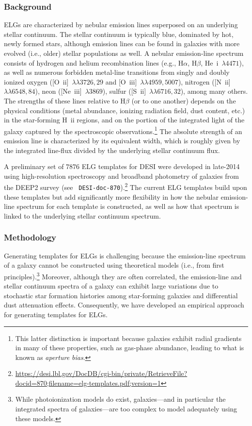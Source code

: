 \documentclass[12pt]{article}
\newcommand{\ha}{H\ensuremath{\alpha}}
\newcommand{\hb}{H\ensuremath{\beta}}
\newcommand{\heli}{He~{\sc i}~\ensuremath{\lambda4471}}
\newcommand{\hii}{H~{\sc ii}}
\newcommand{\niilam}{[N~{\sc ii}]~\ensuremath{\lambda\lambda6548,84}}
\newcommand{\siilam}{[S~{\sc ii}]~\ensuremath{\lambda\lambda6716,32}}
\newcommand{\oiilam}{[O~{\sc ii}]~\ensuremath{\lambda\lambda3726,29}}
\newcommand{\oiiilam}{[O~{\sc iii}]~\ensuremath{\lambda\lambda4959,5007}}
\newcommand{\neonlam}{[Ne~{\sc iii}]~\ensuremath{\lambda3869}}
\begin{document}
\subsubsection{Background}

ELGs are characterized by nebular emission lines superposed on an underlying
stellar continuum.  The stellar continuum is typically blue, dominated by hot,
newly formed stars, although emission lines can be found in galaxies with more
evolved (i.e., older) stellar populations as well.  A nebular emission-line
spectrum consists of hydrogen and helium recombination lines (e.g., \ha, \hb,
\heli), as well as numerous forbidden metal-line transitions from singly and
doubly ionized oxygen (\oiilam{} and \oiiilam), nitrogen (\niilam), neon
(\neonlam), sulfur (\siilam), among many others.  The strengths of these lines
relative to \hb{} (or to one another) depends on the physical conditions (metal
abundance, ionizing radiation field, dust content, etc.) in the star-forming
\hii{} regions, and on the portion of the integrated light of the galaxy
captured by the spectroscopic observations.\footnote{This latter distinction is
  important because galaxies exhibit radial gradients in many of these
  properties, such as gas-phase abundance, leading to what is known as {\em
    aperture bias}.}  The absolute strength of an emission line is characterized
by its equivalent width, which is roughly given by the integrated line-flux
divided by the underlying stellar continuum flux.

A preliminary set of $7876$ ELG templates for DESI were developed in late-2014
using high-resolution spectroscopy and broadband photometry of galaxies from the
DEEP2 survey (see {\tt
  DESI-doc-870}).\footnote{\url{https://desi.lbl.gov/DocDB/cgi-bin/private/RetrieveFile?docid=870;filename=elg-templates.pdf;version=1}}
The current ELG templates build upon these templates but add significantly more
flexibility in how the nebular emission-line spectrum for each template is
constructed, as well as how that spectrum is linked to the underlying stellar
continuum spectrum.

\subsubsection{Methodology}

Generating templates for ELGs is challenging because the emission-line spectrum
of a galaxy cannot be constructed using theoretical models (i.e., from first
principles).\footnote{While photoionization models do exist, galaxies---and in
  particular the integrated spectra of galaxies---are too complex to model
  adequately using these models.}  Moreover, although they are often correlated,
the emission-line and stellar continuum spectra of a galaxy can exhibit large
variations due to stochastic star formation histories among star-forming
galaxies and differential dust attenuation effects.  Consequently, we have
developed an empirical approach for generating templates for ELGs.
\end{document}
